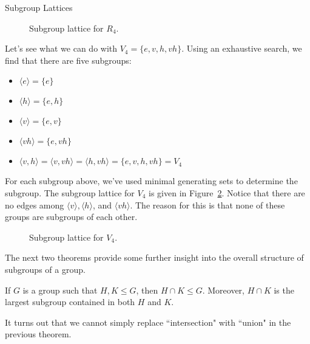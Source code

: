 \begin{section}{Subgroup Lattices}
\begin{figure}[!ht]
\caption{Subgroup lattice for $R_4$.}
\label{fig:latticeR4}
\end{figure}

Let's see what we can do with $V_4=\{e,v,h,vh\}$.  Using an exhaustive search, we find that there are five subgroups:
\begin{itemize}
\item[] $\langle e \rangle = \{e\}$
\item[] $\langle h \rangle  = \{e,h\}$
\item[] $\langle v \rangle  = \{e,v\}$
\item[] $\langle vh \rangle  = \{e,vh\}$
\item[] $\langle v,h \rangle = \langle v,vh\rangle = \langle h, vh\rangle= \{e,v,h,vh\}=V_4$
\end{itemize}
For each subgroup above, we've used minimal generating sets to determine the subgroup.  The subgroup lattice for $V_4$ is given in Figure~\ref{fig:latticeV4}. Notice that there are no edges among $\langle v\rangle, \langle h\rangle$, and $\langle vh\rangle$.  The reason for this is that none of these groups are subgroups of each other.

\begin{figure}[!ht]
\centering
{}
\caption{Subgroup lattice for $V_4$.}
\label{fig:latticeV4}
\end{figure}

The next two theorems provide some further insight into the overall structure of subgroups of a group.

\begin{theorem}\label{thm:subgroup_intersection}
If $G$ is a group such that $H,K\leq G$, then $H\cap K\leq G$. Moreover, $H\cap K$ is the largest subgroup contained in both $H$ and $K$.
\end{theorem}

It turns out that we cannot simply replace ``intersection" with ``union" in the previous theorem.


\end{section}
